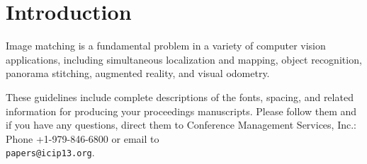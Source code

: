 
\section{Introduction}
\label{sec:intro}

Image matching is a fundamental problem in a variety of computer vision applications, including simultaneous localization and mapping\cite{Chang2007PSlam,Davison2007Monoslam}, object recognition\cite{Nister2006Scalable}, panorama stitching\cite{Brown2003Recognising,Wagner2010RealTimeb}, augmented reality\cite{Klein2007Parallel,Wagner2009Multiple}, and visual odometry\cite{Cheng2006Visual,Nister2004Visual}.

These guidelines include complete descriptions of the fonts, spacing, and
related information for producing your proceedings manuscripts. Please follow
them and if you have any questions, direct them to Conference Management
Services, Inc.: Phone +1-979-846-6800 or email
to \\\texttt{papers@icip13.org}.
